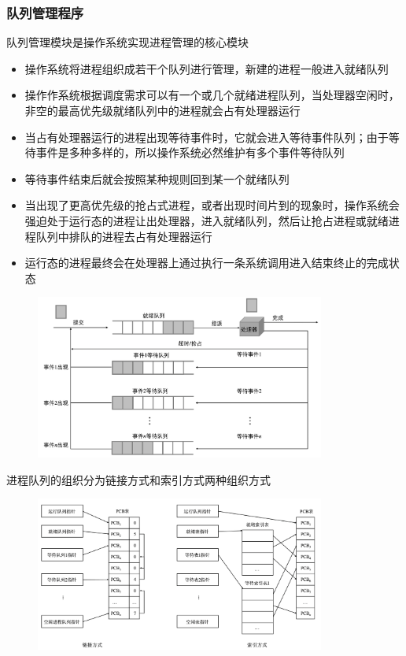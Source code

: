 \documentclass[cs4size,a4paper,10pt]{ctexart}
\begin{document}
	\subsubsection{队列管理程序}
	队列管理模块是操作系统实现进程管理的核心模块
	\begin{itemize}
		\item 操作系统将进程组织成若干个队列进行管理，新建的进程一般进入就绪队列
		\item 操作作系统根据调度需求可以有一个或几个就绪进程队列，当处理器空闲时，非空的最高优先级就绪队列中的进程就会占有处理器运行
		\item 当占有处理器运行的进程出现等待事件时，它就会进入等待事件队列；由于等待事件是多种多样的，所以操作系统必然维护有多个事件等待队列
		\item 等待事件结束后就会按照某种规则回到某一个就绪队列
		\item 当出现了更高优先级的抢占式进程，或者出现时间片到的现象时，操作系统会强迫处于运行态的进程让出处理器，进入就绪队列，然后让抢占进程或就绪进程队列中排队的进程去占有处理器运行
		\item 运行态的进程最终会在处理器上通过执行一条系统调用进入结束终止的完成状态
	\end{itemize}

	\begin{figure}[H]
		\centering
		\includegraphics[width=0.85\textwidth]{img/2.3.3.1.1}
	\end{figure}
	进程队列的组织分为链接方式和索引方式两种组织方式
	\begin{figure}[H]
		\centering
		\includegraphics[width=0.85\textwidth]{img/2.3.3.1.2}
	\end{figure}
\end{document}
